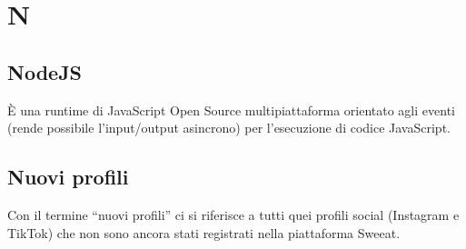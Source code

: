 \section{N}

\subsection{NodeJS} È una runtime di JavaScript Open Source multipiattaforma orientato agli eventi (rende possibile l’input/output asincrono) per l’esecuzione di codice JavaScript.

\subsection{Nuovi profili} Con il termine “nuovi profili” ci si riferisce a tutti quei profili social (Instagram e TikTok) che non sono ancora stati registrati nella piattaforma Sweeat.

\clearpage